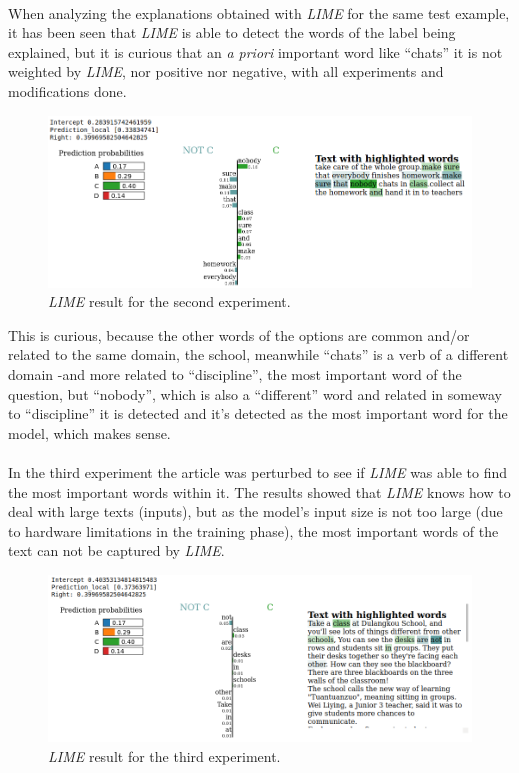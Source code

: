 \paragraph{}
When analyzing the explanations obtained with \emph{LIME} for the same test example, it has been seen that \emph{LIME} is able to detect the words of the label being explained, but it is curious that an \emph{a priori} important word like ``chats'' it is not weighted by \emph{LIME}, nor positive nor negative, with all experiments and modifications done.
\begin{figure}[!h]
	\centering
	\includegraphics[scale=0.35]{images/lime-ex2-example1-real}
	\caption{\emph{LIME} result for the second experiment.}
	\label{fig:lime-result-2a}
\end{figure}
This is curious, because the other words of the options are common and/or related to the same domain, the school, meanwhile ``chats'' is a verb of a different domain -and more related to ``discipline'', the most important word of the question, but ``nobody'', which is also a ``different'' word and related in someway to ``discipline'' it is detected and it's detected as the most important word for the model, which makes sense.

\paragraph{}
In the third experiment the article was perturbed to see if \emph{LIME} was able to find the most important words within it. The results showed that \emph{LIME} knows how to deal with large texts (inputs), but as the model's input size is not too large (due to hardware limitations in the training phase), the most important words of the text can not be captured by \emph{LIME}.
\begin{figure}[!h]
	\centering
	\includegraphics[scale=0.35]{images/lime-ex3-example1-real}
	\caption{\emph{LIME} result for the third experiment.}
	\label{fig:lime-result-3a}
\end{figure}
